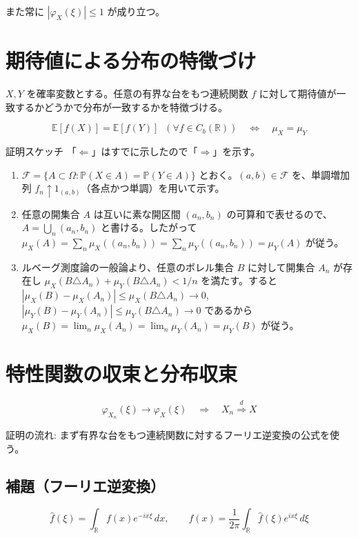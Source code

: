 \documentclass[uplatex,dvipdfmx,11pt,a4paper,openany]{bxjsbook}
\begin{document}
また常に \(|\varphi_X(\xi)|\le 1\) が成り立つ。

\section{期待値による分布の特徴づけ}
\(X,Y\) を確率変数とする。任意の有界な台をもつ連続関数 \(f\) に対して期待値が一致するかどうかで分布が一致するかを特徴づける。

\[\mathbb{E}[f(X)]=\mathbb{E}[f(Y)] \;\;(\forall f\in C_b(\mathbb{R}))\quad\Longleftrightarrow\quad \mu_X=\mu_Y\]

\begin{detailblock}{証明スケッチ}
「\(\Leftarrow\)」はすでに示したので「\(\Rightarrow\)」を示す。

\begin{enumerate}
\item \(\mathcal{F}=\{A\subset\Omega:\mathbb{P}(X\in A)=\mathbb{P}(Y\in A)\}\) とおく。\((a,b)\in\mathcal{F}\) を、単調増加列 \(f_n\uparrow 1_{(a,b)}\)（各点かつ単調）を用いて示す。
\item 任意の開集合 \(A\) は互いに素な開区間 \((a_n,b_n)\) の可算和で表せるので、\(A=\bigcup_n(a_n,b_n)\) と書ける。したがって
                        \(\mu_X(A)=\sum_n\mu_X((a_n,b_n))=\sum_n\mu_Y((a_n,b_n))=\mu_Y(A)\) が従う。
\item ルベーグ測度論の一般論より、任意のボレル集合 \(B\) に対して開集合 \(A_n\) が存在し
                        \(\mu_X(B\triangle A_n)+\mu_Y(B\triangle A_n)<1/n\) を満たす。すると
                        \(|\mu_X(B)-\mu_X(A_n)|\le\mu_X(B\triangle A_n)\to 0\),
                        \(|\mu_Y(B)-\mu_Y(A_n)|\le\mu_Y(B\triangle A_n)\to 0\) であるから
                        \(\mu_X(B)=\lim_n\mu_X(A_n)=\lim_n\mu_Y(A_n)=\mu_Y(B)\) が従う。
\end{enumerate}

\end{detailblock}

\section{特性関数の収束と分布収束}
\[\varphi_{X_n}(\xi)\to\varphi_X(\xi)\quad\Rightarrow\quad X_n\overset{d}{\Rightarrow} X\]

証明の流れ: まず有界な台をもつ連続関数に対するフーリエ逆変換の公式を使う。

\subsection{補題（フーリエ逆変換）}
\[\hat f(\xi)=\int_{\mathbb{R}} f(x)e^{-i x\xi}\,dx,\qquad
                f(x)=\frac{1}{2\pi}\int_{\mathbb{R}} \hat f(\xi)e^{i x\xi}\,d\xi\]
\end{document}
